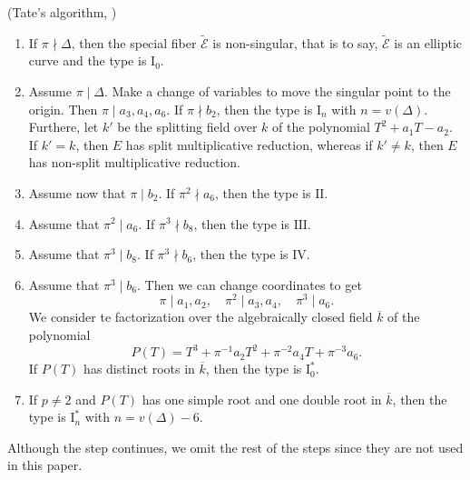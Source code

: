 \documentclass[main]{subfiles}
\begin{document}
\begin{algo}{(Tate's algorithm, \cite[IV \S 9]{ref:advancedaec})}
    \begin{enumerate}[label=Step \arabic*., leftmargin=2cm]
        \item If $\pi \nmid \Delta$, then the special fiber $\tilde{\mathcal{E}}$ is non-singular, that is to say, $\tilde{\mathcal{E}}$ is an elliptic curve and the type is $\mathrm{I}_0$.
        \item Assume $\pi \mid \Delta$.
            Make a change of variables to move the singular point to the origin.
            Then $\pi \mid a_3, a_4, a_6$.
            If $\pi \nmid b_2$, then the type is $\mathrm{I}_n$ with $n = v(\Delta)$.
            Furthere, let $k'$ be the splitting field over $k$ of the polynomial $T^2 + a_1 T - a_2$.
            If $k' = k$, then $E$ has split multiplicative reduction, whereas if $k' \neq k$, then $E$ has non-split multiplicative reduction.
        \item Assume now that $\pi \mid b_2$.
            If $\pi^2 \nmid a_6$, then the type is $\mathrm{II}$.
        \item Assume that $\pi^2 \mid a_6$.
            If $\pi^3 \nmid b_8$, then the type is $\mathrm{III}$.
        \item Assume that $\pi^3 \mid b_8$.
            If $\pi^3 \nmid b_6$, then the type is $\mathrm{IV}$.
        \item Assume that $\pi^3 \mid b_6$.
            Then we can change coordinates to get
            \begin{equation*}
                \pi \mid a_1, a_2,\quad \pi^2 \mid a_3, a_4,\quad \pi^3 \mid a_6.
            \end{equation*}
            We consider te factorization over the algebraically closed field $\overline{k}$ of the polynomial
            \begin{equation*}
                P(T) = T^3 + \pi^{-1}a_2 T^2 + \pi^{-2}a_4 T + \pi^{-3}a_6.
            \end{equation*}
            If $P(T)$ has distinct roots in $\overline{k}$, then the type is $\mathrm{I}_0^*$.
        \item If $p \neq 2$ and $P(T)$ has one simple root and one double root in $\overline{k}$, then the type is $\mathrm{I}_n^*$ with $n = v(\Delta)-6$.
    \end{enumerate}
    Although the step continues, we omit the rest of the steps since they are not used in this paper.
\end{algo}
\end{document}
